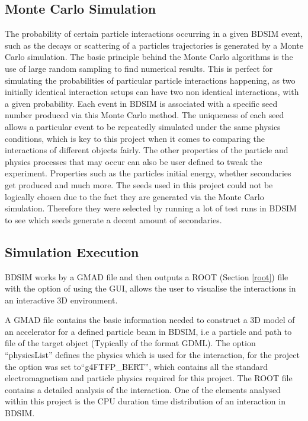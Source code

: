 \documentclass[12pt,a4paper]{article}
\begin{document}
\subsection{Monte Carlo Simulation}
\label{monte}
\noindent The probability of certain particle interactions occurring in a given BDSIM event, such as the decays or scattering of a particles trajectories is generated by a Monte Carlo simulation. The basic principle behind the Monte Carlo algorithms is the use of large random sampling to find numerical results. This is perfect for simulating the probabilities of particular particle interactions happening, as two initially identical interaction setups can have two non identical interactions, with a given probability. Each event in BDSIM is associated with a specific seed number produced via this Monte Carlo method. The uniqueness of each seed allows a particular event to be repeatedly simulated under the same physics conditions, which is key to this project when it comes to comparing the interactions of different objects fairly. The other properties of the particle and physics processes that may occur can also be user defined to tweak the experiment. Properties such as the particles initial energy, whether secondaries get produced and much more. The seeds used in this project could not be logically chosen due to the fact they are generated via the Monte Carlo simulation. Therefore they were selected by running a lot of test runs in BDSIM to see which seeds generate a decent amount of secondaries.

\subsection{Simulation Execution}

BDSIM works by  a GMAD file and then outputs  a ROOT (Section \ref{root}) file with the option of using the GUI, allows the user to visualise the interactions in an interactive 3D environment.

 A GMAD file contains the basic information needed to construct a 3D model of an accelerator for a defined particle beam in BDSIM, i.e a particle and path to file of the target object (Typically of the format GDML). The option ``physicsList'' defines the physics which is used for the interaction, for the project the option was set to``g4FTFP\_BERT'', which contains all the standard electromagnetism and particle physics required for this project. The ROOT file contains a detailed analysis of the interaction. One of the elements analysed within this project is the CPU duration time distribution of an interaction in BDSIM.
\end{document}
